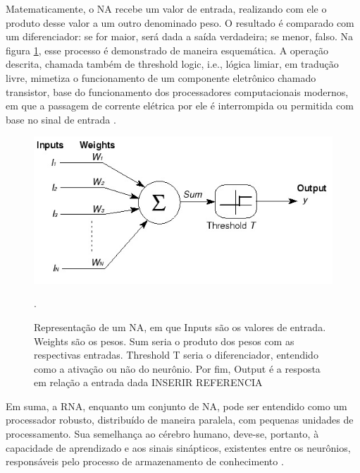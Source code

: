 Matematicamente, o NA recebe um valor de entrada, realizando com ele o produto desse valor a um outro denominado peso. O resultado é comparado com um diferenciador: se for maior, será dada a saída verdadeira; se menor, falso. Na figura \ref{fig:na}, esse processo é demonstrado de maneira esquemática. A operação descrita, chamada também de threshold logic, i.e., lógica limiar, em tradução livre, mimetiza o funcionamento de um componente eletrônico chamado transistor, base do funcionamento dos processadores computacionais modernos, em que a passagem de corrente elétrica por ele é interrompida ou permitida com base no sinal de entrada \cite {mcculloch1943logical}.

\begin{figure}[!h]
    \centering
    \begin{minipage}{0.9\linewidth}
    \centering
    \captionsetup{justification=centering,margin=0.5cm,font=small}
    \includegraphics[width=0.7\linewidth]{img/cap2/na.jpeg}
    \caption{Representação de um NA, em que Inputs são os valores de entrada. Weights são os pesos. Sum seria o produto dos pesos com as respectivas entradas. Threshold T seria o diferenciador, entendido como a ativação ou não do neurônio. Por fim, Output é a resposta em relação a entrada dada INSERIR REFERENCIA}.
    \label{fig:na}
    \end{minipage}
\end{figure}

Em suma, a RNA, enquanto um conjunto de NA, pode ser entendido como um processador robusto, distribuído de maneira paralela, com pequenas unidades de processamento. Sua semelhança ao cérebro humano, deve-se, portanto, à capacidade de aprendizado e aos sinais sinápticos, existentes entre os neurônios, responsáveis pelo processo de armazenamento de conhecimento \cite{haykin2001redes}.
	
